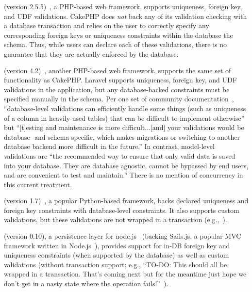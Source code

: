  (version 2.5.5)~\cite{code-cakephp}, a PHP-based web
framework, supports uniqueness, foreign key, and UDF
validations. CakePHP does \textit{not} back any of its validation
checking with a database transaction and relies on the user to
correctly specify any corresponding foreign keys or uniqueness
constraints within the database the schema. Thus, while users can
declare each of these validations, there is no guarantee that they are
actually enforced by the database.

 (version 4.2)~\cite{code-laravel}, another PHP-based web
framework, supports the same set of functionality as CakePHP. Laravel
supports uniqueness, foreign key, and UDF validations in the
application, but any database-backed constraints must be specified
manually in the schema. Per one set of community documentation~\cite{laravel-book}, ``database-level
validations can efficiently handle some things (such as uniqueness of
a column in heavily-used tables) that can be difficult to implement
otherwise'' but ``[t]esting and maintenance is more difficult...[and]
your validations would be database- and schema-specific, which makes
migrations or switching to another database backend more difficult in
the future.'' In contrast, model-level validations are ``the
recommended way to ensure that only valid data is saved into your
database. They are database agnostic, cannot be bypassed by end users,
and are convenient to test and maintain.'' There
is no mention of concurrency in this current treatment.

 (version 1.7)~\cite{code-django}, a popular Python-based
framework, backs declared
uniqueness and foreign key constraints with database-level
constraints. It also supports custom validations, but these
validations are not wrapped
in a transaction (e.g.,~\cite{code-django-constraints}).

 (version 0.10), a persistence layer for
node.js~\cite{code-waterline} (backing Sails.js, a popular MVC
framework written in Node.js~\cite{code-sails}), provides support for
in-DB foreign key and uniqueness constraints (when supported by the
database) as well as custom validations (without transaction support;
e.g., ``TO-DO: This should all be wrapped in a transaction. That's
coming next but for the meantime just hope we don't get in a nasty
state where the operation
fails!''~\cite{code-waterline-txn}).


